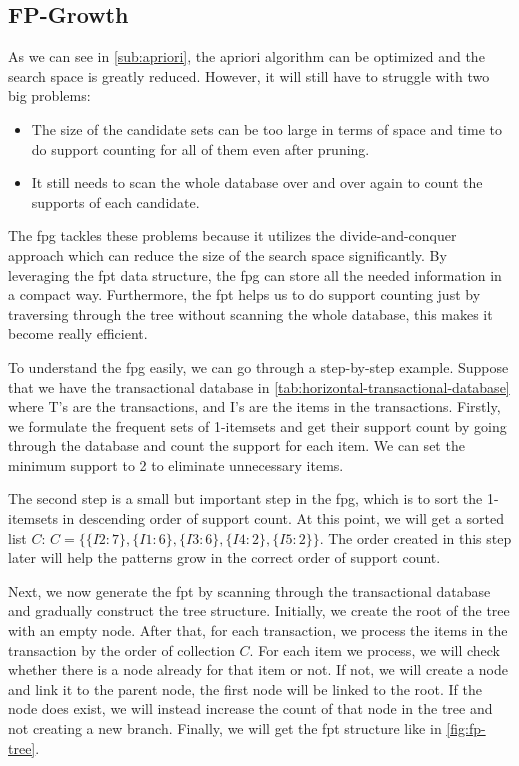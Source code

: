\subsection{FP-Growth}
\label{sub:fp-growth}

As we can see in \autoref{sub:apriori}, the \acl{apriori} algorithm can be optimized and the search space is greatly reduced.
However, it will still have to struggle with two big problems:
\begin{itemize}
    \item The size of the candidate sets can be too large in terms of space and time to do support counting for all of them even after pruning.
    \item It still needs to scan the whole database over and over again to count the supports of each candidate.
\end{itemize}
The \acl{fpg} tackles these problems because it utilizes the divide-and-conquer approach which can reduce the size of the search space significantly.
By leveraging the \acl{fpt} data structure, the \acl{fpg} can store all the needed information in a compact way.
Furthermore, the \acl{fpt} helps us to do support counting just by traversing through the tree without scanning the whole database, this makes it become really efficient.

To understand the \acl{fpg} easily, we can go through a step-by-step example.
Suppose that we have the transactional database in \autoref{tab:horizontal-transactional-database} where T's are the transactions, and I's are the items in the transactions.
Firstly, we formulate the frequent sets of 1-itemsets and get their support count by going through the database and count the support for each item.
We can set the minimum support to 2 to eliminate unnecessary items.

The second step is a small but important step in the \acl{fpg}, which is to sort the 1-itemsets in descending order of support count.
At this point, we will get a sorted list $C$: $C=\{\{I2:7\}, \{I1:6\}, \{I3:6\}, \{I4:2\}, \{I5:2\}\}$.
The order created in this step later will help the patterns grow in the correct order of support count.

Next, we now generate the \acl{fpt} by scanning through the transactional database and gradually construct the tree structure.
 Initially, we create the root of the tree with an empty node.
After that, for each transaction, we process the items in the transaction by the order of collection $C$.
For each item we process, we will check whether there is a node already for that item or not.
If not, we will create a node and link it to the parent node, the first node will be linked to the root.
If the node does exist, we will instead increase the count of that node in the tree and not creating a new branch.
Finally, we will get the \acl{fpt} structure like in \autoref{fig:fp-tree}.

